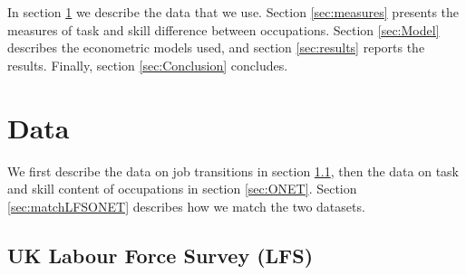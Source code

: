 \documentclass[11pt, oneside]{article}
\begin{document}
	
	\vspace{2mm}
	
	
 In section \ref{sec:Data} we describe the data that we use. Section \ref{sec:measures} presents the measures of task and skill difference between occupations. Section \ref{sec:Model} describes the econometric models used, and section \ref{sec:results} reports the results. Finally, section \ref{sec:Conclusion} concludes.
	


	
	\section{Data}
	\label{sec:Data}
	We first describe the data on job transitions in section \ref{sec:LFS}, then the data on task and skill content of occupations in section \ref{sec:ONET}. Section \ref{sec:matchLFSONET} describes how we match the two datasets.
	\subsection{UK Labour Force Survey (LFS)}
	\label{sec:LFS}
	
\end{document}
